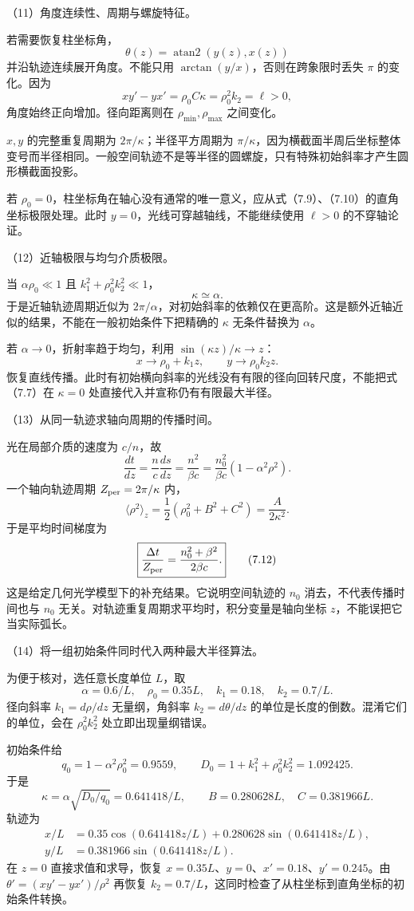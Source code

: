 \documentclass[12pt,a4paper,fontset=fandol]{ctexart}
\begin{document}
（11）角度连续性、周期与螺旋特征。

若需要恢复柱坐标角， \[
\theta(z)=\operatorname{atan2}(y(z),x(z))
\] 并沿轨迹连续展开角度。不能只用 \(\arctan(y/x)\)，否则在跨象限时丢失
\(\pi\) 的变化。因为 \[
xy'-yx'=\rho_0C\kappa=\rho_0^2k_2=\ell>0,
\] 角度始终正向增加。径向距离则在 \(\rho_{\min},\rho_{\max}\) 之间变化。

\(x,y\) 的完整重复周期为 \(2\pi/\kappa\)；半径平方周期为
\(\pi/\kappa\)，因为横截面半周后坐标整体变号而半径相同。一般空间轨迹不是等半径的圆螺旋，只有特殊初始斜率才产生圆形横截面投影。

若
\(\rho_0=0\)，柱坐标角在轴心没有通常的唯一意义，应从式（7.9）、（7.10）的直角坐标极限处理。此时
\(y=0\)，光线可穿越轴线，不能继续使用 \(\ell>0\) 的不穿轴论证。

（12）近轴极限与均匀介质极限。

当 \(\alpha\rho_0\ll1\) 且 \(k_1^2+\rho_0^2k_2^2\ll1\)， \[
\kappa\simeq\alpha.
\] 于是近轴轨迹周期近似为
\(2\pi/\alpha\)，对初始斜率的依赖仅在更高阶。这是额外近轴近似的结果，不能在一般初始条件下把精确的
\(\kappa\) 无条件替换为 \(\alpha\)。

若 \(\alpha\to0\)，折射率趋于均匀，利用 \(\sin(\kappa z)/\kappa\to z\)：
\[
x\to\rho_0+k_1z,\qquad y\to\rho_0k_2z.
\]
恢复直线传播。此时有初始横向斜率的光线没有有限的径向回转尺度，不能把式（7.7）在
\(\kappa=0\) 处直接代入并宣称仍有有限最大半径。

（13）从同一轨迹求轴向周期的传播时间。

光在局部介质的速度为 \(c/n\)，故 \[
\frac{dt}{dz}=\frac nc\frac{ds}{dz}
=\frac{n^2}{\beta c}
=\frac{n_0^2}{\beta c}(1-\alpha^2\rho^2).
\] 一个轴向轨迹周期 \(Z_{\rm per}=2\pi/\kappa\) 内， \[
\langle\rho^2\rangle_z=
\frac12(\rho_0^2+B^2+C^2)=\frac{A}{2\kappa^2}.
\] 于是平均时间梯度为 \[
\boxed{\frac{\Delta t}{Z_{\rm per}}
=\frac{n_0^2+\beta^2}{2\beta c}.}\tag{7.12}
\] 这是给定几何光学模型下的补充结果。它说明空间轨迹的 \(n_0\)
消去，不代表传播时间也与 \(n_0\)
无关。对轨迹重复周期求平均时，积分变量是轴向坐标
\(z\)，不能误把它当实际弧长。

（14）将一组初始条件同时代入两种最大半径算法。

为便于核对，选任意长度单位 \(L\)，取 \[
\alpha=0.6/L,\quad \rho_0=0.35L,\quad
k_1=0.18,\quad k_2=0.7/L.
\] 径向斜率 \(k_1=d\rho/dz\) 无量纲，角斜率 \(k_2=d\theta/dz\)
的单位是长度的倒数。混淆它们的单位，会在 \(\rho_0^2k_2^2\)
处立即出现量纲错误。

初始条件给 \[
q_0=1-\alpha^2\rho_0^2=0.9559,
\qquad D_0=1+k_1^2+\rho_0^2k_2^2=1.092425.
\] 于是 \[
\kappa=\alpha\sqrt{D_0/q_0}=0.641418/L,
\qquad B=0.280628L,\quad C=0.381966L.
\] 轨迹为 \[
\begin{aligned}
x/L&=0.35\cos(0.641418z/L)
+0.280628\sin(0.641418z/L),\\
y/L&=0.381966\sin(0.641418z/L).
\end{aligned}
\] 在 \(z=0\) 直接求值和求导，恢复
\(x=0.35L\)、\(y=0\)、\(x'=0.18\)、\(y'=0.245\)。由
\(\theta'=(xy'-yx')/\rho^2\) 再恢复
\(k_2=0.7/L\)，这同时检查了从柱坐标到直角坐标的初始条件转换。
\end{document}
